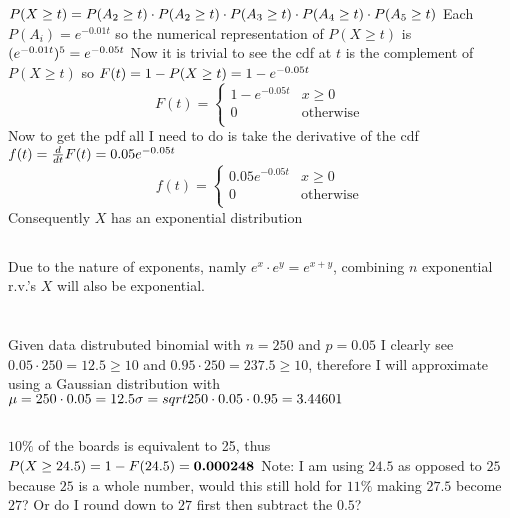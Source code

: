 \documentclass[12pt, letterpaper]{article}
\begin{document}
\(
P(X \ge t) = P(A_2 \ge t) \cdot P(A_2 \ge t) \cdot P(A_3 \ge t) \cdot P(A_4 \ge t) \cdot P(A_5 \ge t) \\
\)
Each $P(A_i) = e^{-0.01t}$ so the numerical representation of $P(X \ge t)$ is
\newline
\(
(e^{-0.01t})^5 = e^{-0.05t} \\
\)
Now it is trivial to see the cdf at $t$ is the complement of $P(X \ge t)$ so
\newline
\(
F(t) = 1 - P(X \ge t) = 1 - e^{-0.05t}\\
\)
\[
F(t) = 
\begin{cases}
1 - e^{-0.05t} & x \ge 0 \\
0 & \textrm{otherwise} \\
\end{cases}
\]
Now to get the pdf all I need to do is take the derivative of the cdf \\
\(
f(t) = \frac{d}{dt}F(t) \\
= 0.05e^{-0.05t} \\
\)
\[
f(t) =
\begin{cases}
0.05e^{-0.05t} & x \ge 0 \\
0 & \textrm{otherwise} \\
\end{cases}
\]
\newline
Consequently $X$ has an exponential distribution
\subsection{}
Due to the nature of exponents, namly $e^{x} \cdot e^{y} = e^{x+y}$, combining $n$
exponential r.v.'s $X$ will also be exponential.

\newpage
\section{}
Given data distrubuted binomial with $n = 250$ and $p = 0.05$ I clearly see $0.05 \cdot 250 = 12.5 \ge 10$ and $0.95 \cdot 250 = 237.5 \ge 10$,
therefore I will approximate using a Gaussian distribution with \\
\(
\mu = 250 \cdot 0.05 = 12.5 \\
\sigma = sqrt{250 \cdot 0.05 \cdot 0.95} = 3.44601 \\
\)
\subsection{}
$10\%$ of the boards is equivalent to 25, thus \\
\(
P(X \ge 24.5) = 1 - F(24.5) = \textbf{0.000248} \\
\)
Note: I am using $24.5$ as opposed to $25$ because $25$ is a whole number,
would this still hold for $11\%$ making $27.5$ become $27$? Or do I round down
to $27$ first then subtract the $0.5$? 
\end{document}
